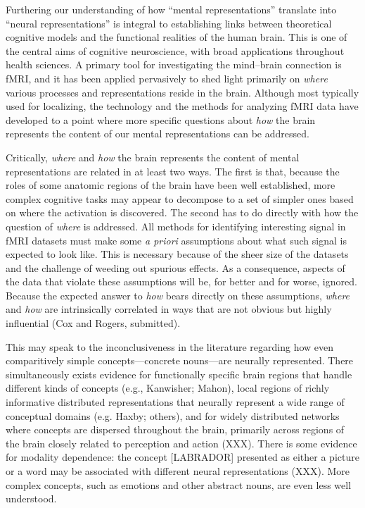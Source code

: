 Furthering our understanding of how ``mental representations'' translate into ``neural representations'' is integral to establishing links between theoretical cognitive models and the functional realities of the human brain. This is one of the central aims of cognitive neuroscience, with broad applications throughout health sciences. A primary tool for investigating the mind--brain connection is fMRI, and it has been applied pervasively to shed light primarily on {\em where} various processes and representations reside in the brain. Although most typically used for localizing, the technology and the methods for analyzing fMRI data have developed to a point where more specific questions about {\em how} the brain represents the content of our mental representations can be addressed. 

Critically, {\em where} and {\em how} the brain represents the content of mental representations are related in at least two ways. The first is that, because the roles of some anatomic regions of the brain have been well established, more complex cognitive tasks may appear to decompose to a set of simpler ones based on where the activation is discovered. The second has to do directly with how the question of {\em where} is addressed. All methods for identifying interesting signal in fMRI datasets must make some {\it a priori} assumptions about what such signal is expected to look like. This is necessary because of the sheer size of the datasets and the challenge of weeding out spurious effects. As a consequence, aspects of the data that violate these assumptions will be, for better and for worse, ignored. Because the expected answer to {\em how} bears directly on these assumptions, {\em where} and {\em how} are intrinsically correlated in ways that are not obvious but highly influential (Cox and Rogers, submitted). 

This may speak to the inconclusiveness in the literature regarding how even comparitively simple concepts---concrete nouns---are neurally represented. There simultaneously exists evidence for functionally specific brain regions that handle different kinds of concepts (e.g., Kanwisher; Mahon), local regions of richly informative distributed representations that neurally represent a wide range of conceptual domains (e.g. Haxby; others), and for widely distributed networks where concepts are dispersed throughout the brain, primarily across regions of the brain closely related to perception and action (XXX). There is some evidence for modality dependence: the concept [LABRADOR] presented as either a picture or a word may be associated with different neural representations (XXX). More complex concepts, such as emotions and other abstract nouns, are even less well understood.


